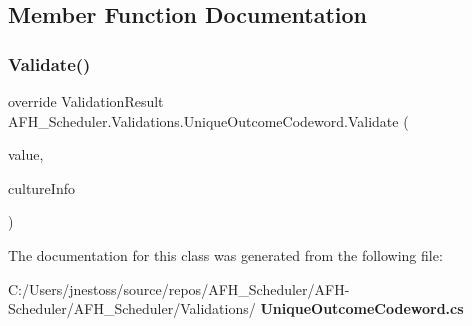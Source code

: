 \subsection{Member Function Documentation}
\mbox{\label{class_a_f_h___scheduler_1_1_validations_1_1_unique_outcome_codeword_a692372756635b4fd7f2a12a3917768df}} 
\subsubsection{Validate()}
{\footnotesize\ttfamily override Validation\+Result A\+F\+H\+\_\+\+Scheduler.\+Validations.\+Unique\+Outcome\+Codeword.\+Validate (\begin{DoxyParamCaption}\item[{object}]{value,  }\item[{Culture\+Info}]{culture\+Info }\end{DoxyParamCaption})}



The documentation for this class was generated from the following file\+:\begin{DoxyCompactItemize}
\item 
C\+:/\+Users/jnestoss/source/repos/\+A\+F\+H\+\_\+\+Scheduler/\+A\+F\+H-\/\+Scheduler/\+A\+F\+H\+\_\+\+Scheduler/\+Validations/\textbf{ Unique\+Outcome\+Codeword.\+cs}\end{DoxyCompactItemize}
